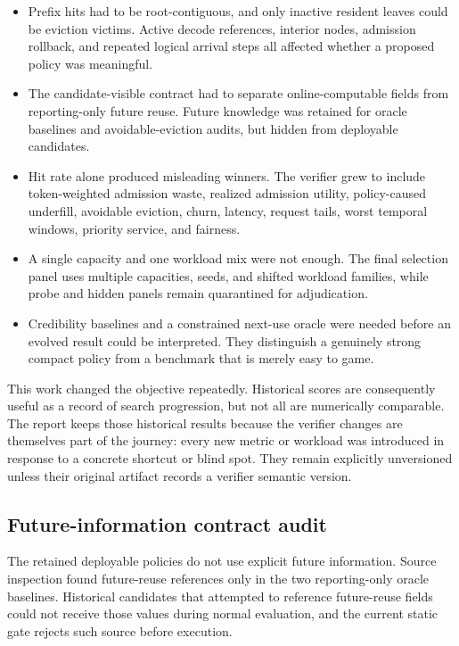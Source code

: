 \documentclass[11pt]{article}
\begin{document}
\begin{itemize}
  \item Prefix hits had to be root-contiguous, and only inactive resident leaves could
  be eviction victims.  Active decode references, interior nodes, admission rollback,
  and repeated logical arrival steps all affected whether a proposed policy was
  meaningful.
  \item The candidate-visible contract had to separate online-computable fields from
  reporting-only future reuse.  Future knowledge was retained for oracle baselines and
  avoidable-eviction audits, but hidden from deployable candidates.
  \item Hit rate alone produced misleading winners.  The verifier grew to include
  token-weighted admission waste, realized admission utility, policy-caused underfill,
  avoidable eviction, churn, latency, request tails, worst temporal windows, priority
  service, and fairness.
  \item A single capacity and one workload mix were not enough.  The final selection
  panel uses multiple capacities, seeds, and shifted workload families, while probe and
  hidden panels remain quarantined for adjudication.
  \item Credibility baselines and a constrained next-use oracle were needed before an
  evolved result could be interpreted.  They distinguish a genuinely strong compact
  policy from a benchmark that is merely easy to game.
\end{itemize}

This work changed the objective repeatedly.  Historical scores are consequently useful
as a record of search progression, but not all are numerically comparable.  The report
keeps those historical results because the verifier changes are themselves part of
the journey: every new metric or workload was introduced in response to a concrete
shortcut or blind spot.  They remain explicitly unversioned unless their original
artifact records a verifier semantic version.

\subsection{Future-information contract audit}

The retained deployable policies do not use explicit future information.  Source
inspection found future-reuse references only in the two reporting-only oracle
baselines.  Historical candidates that attempted to reference future-reuse fields
could not receive those values during normal evaluation, and the current static gate
rejects such source before execution.
\end{document}
